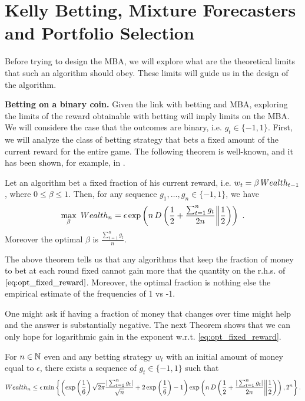 \section{Kelly Betting, Mixture Forecasters and Portfolio Selection}
\label{sec:kelly}

Before trying to design the \ac{MBA}, we will explore what are the theoretical limits that such an algorithm should obey. These limits will guide us in the design of the algorithm.

\textbf{Betting on a binary coin.}
Given the link with betting and \ac{MBA}, exploring the limits of the reward obtainable with betting will imply limits on the \ac{MBA}.
We will considere the case that the outcomes are binary, i.e. $g_t \in \{-1,1\}$.
First, we will analyze the class of betting strategy that bets a fixed amount of the current reward for the entire game.
The following theorem is well-known, and it has been shown, for example, in \cite{}.

\begin{theorem}
\label{thm:oracle_fraction}
Let an algorithm bet a fixed fraction of his current reward, i.e. $w_t=\beta \, Wealth_{t-1}$, where $0\leq\beta\leq1$. Then, for any sequence $g_1, \ldots, g_n \in \{-1,1\}$, we have
\begin{equation}
\label{eq:opt_fixed_reward}
\max_{\beta} \ Wealth_{n}
= \epsilon \exp\left(n\, D\left(\frac{1}{2}+\frac{\sum_{t=1}^n g_t}{2 n}\middle\|\frac{1}{2}\right)\right)~. 
\end{equation}
Moreover the optimal $\beta$ is $\frac{\sum_{t=1}^n g_t}{n}$.
\end{theorem}

The above theorem tells us that any algorithms that keep the fraction of money to bet at each round fixed cannot gain more that the quantity on the r.h.s. of $\eqref{eq:opt_fixed_reward}$. Moreover, the optimal fraction is nothing else the empirical estimate of the frequencies of 1 vs -1.

One might ask if having a fraction of money that changes over time might help and the answer is substantially negative. The next Theorem shows that we can only hope for logarithmic gain in the exponent w.r.t. \eqref{eq:opt_fixed_reward}.
\begin{theorem}
\label{thm:oracle_fraction_changing}
For $n \in \mathbb{N}$ even and any betting strategy $w_t$ with an initial amount of money equal to $\epsilon$, there exists a sequence of $g_t\in\{-1,1\}$ such that
\[
Wealth_{n}
\leq \epsilon \min\left\{\left(\exp\left(\frac{1}{6}\right)\sqrt{2 \pi}\frac{|\sum_{t=1}^n g_t|}{\sqrt{n}} +2\exp\left(\frac{1}{6}\right)-1\right) \exp\left(n\, D\left(\frac{1}{2}+\frac{|\sum_{t=1}^n g_t|}{2 n}\middle\|\frac{1}{2}\right)\right), 2^n\right\}.
\]
\end{theorem}

